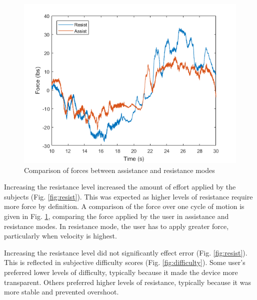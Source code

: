\documentclass[12pt]{report}
\begin{document}

\begin{figure}[h] 
	\centering
	\includegraphics[width=0.9\linewidth]{force_comp}
	\caption{Comparison of forces between assistance and resistance modes}
	\label{fig:force_comp}
\end{figure}
	
	Increasing the resistance level increased the amount of effort applied by the subjects (Fig. \ref{fig:resist}). This was expected as higher levels of resistance require more force by definition. A comparison of the force over one cycle of motion is given in Fig. \ref{fig:force_comp}, comparing the force applied by the user in assistance and resistance modes. In resistance mode, the user has to apply greater force, particularly when velocity is highest. 
	
	Increasing the resistance level did not significantly effect error (Fig. \ref{fig:resist}).  This is reflected in subjective difficulty scores (Fig. \ref{fig:difficulty}). Some user's preferred lower levels of difficulty, typically because it made the device more transparent. Others preferred higher levels of resistance, typically because it was more stable and prevented overshoot. 
\end{document}
